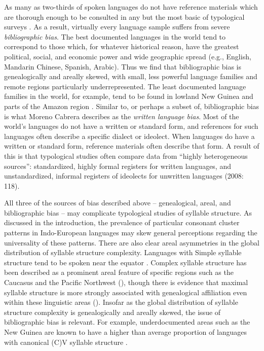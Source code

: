   As many as two-thirds of spoken languages do not have reference materials which are thorough enough to be consulted in any but the most basic of typological surveys \citep[106]{Bakker2011}. As a result, virtually every language sample suffers from severe \textit{bibliographic bias}. The best documented languages in the world tend to correspond to those which, for whatever historical reason, have the greatest political, social, and economic power and wide geographic spread (e.g., English, Mandarin Chinese, Spanish, Arabic). Thus we find that bibliographic bias is genealogically and areally skewed, with small, less powerful language families and remote regions particularly underrepresented. The least documented language families in the world, for example, tend to be found in lowland New Guinea and parts of the Amazon region \citep{Hammarström2010}. Similar to, or perhaps a subset of, bibliographic bias is what Moreno Cabrera describes as the \textit{written language bias}. Most of the world’s languages do not have a written or standard form, and references for such languages often describe a specific dialect or ideolect. When languages do have a written or standard form, reference materials often describe that form. A result of this is that typological studies often compare data from “highly heterogeneous sources”: standardized, highly formal registers for written languages, and unstandardized, informal registers of ideolects for unwritten languages (2008: 118).

  All three of the sources of bias described above -- genealogical, areal, and bibliographic bias -- may complicate typological studies of syllable structure. As discussed in the introduction, the prevalence of particular consonant cluster patterns in Indo-European languages may skew general perceptions regarding the universality of these patterns. There are also clear areal asymmetries in the global distribution of syllable structure complexity. Languages with Simple syllable structure tend to be spoken near the equator \citep{Maddieson2013a}. Complex syllable structure has been described as a prominent areal feature of specific regions such as the Caucasus \citep{Chirikba2008} and the Pacific Northwest (\citealt{ThompsonKinkade1990}), though there is evidence that maximal syllable structure is more strongly associated with genealogical affiliation even within these linguistic areas (\citealt{NapoleãodeSouza2017}). Insofar as the global distribution of syllable structure complexity is genealogically and areally skewed, the issue of bibliographic bias is relevant. For example, underdocumented areas such as the New Guinea are known to have a higher than average proportion of languages with canonical (C)V syllable structure \citep{Maddieson2013a}.

